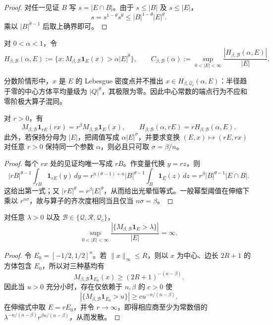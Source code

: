 \begin{proof}
对任一见证 $B$ 写 $s=|E\cap B|$。由于 $s\leq |B|$ 及 $s\leq |E|$，
\[
 s=s^{1-\theta}s^\theta
 \leq |B|^{1-\theta}|E|^\theta.
\]
乘以 $|B|^{\theta-1}$ 后取上确界即可。
\end{proof}

\begin{definition}
\label{fnd:def-halo}
对 $0<\alpha<1$，令
\[
 H_{\beta,\mathcal B}(\alpha,E):=
 \{x:M_{\beta,\mathcal B}\mathbf1_E(x)>\alpha|E|^\theta\},
 \qquad
 C_{\beta,\mathcal B}(\alpha):=
 \sup_{0<|E|<\infty}\frac{|H_{\beta,\mathcal B}(\alpha,E)|}{|E|}.
\]
\end{definition}

\begin{remark}
\label{fnd:center-density}
分数阶情形中，$x$ 是 $E$ 的 Lebesgue 密度点并不推出 $x\in H_{\beta,\mathcal Q_c}(\alpha,E)$：半径趋于零的中心方体平均量级为 $|Q|^\theta$，其极限为零。因此中心常数的端点行为不应和零阶极大算子混同。
\end{remark}

\begin{proposition}[伸缩律与唯一归一化]
\label{fnd:scaling}
对 $r>0$，有
\[
 M_{\beta,\mathcal B}\mathbf1_{rE}(rx)
 =r^\beta M_{\beta,\mathcal B}\mathbf1_E(x),
 \qquad
 H_{\beta,\mathcal B}(\alpha,rE)=rH_{\beta,\mathcal B}(\alpha,E).
\]
此外，若保持分母为 $|E|$，把阈值写成 $\alpha|E|^\sigma$，并要求变换
$(E,x)\mapsto(rE,rx)$ 对任意 $r>0$ 保持同一个参数 $\alpha$，则必且只可取
$\sigma=\beta/n$。
\end{proposition}

\begin{proof}
每个 $rx$ 处的见证均唯一写成 $rB$。作变量代换 $y=rz$，则
\[
 |rB|^{\theta-1}\int_{rB}\mathbf1_{rE}(y)\,dy
 =r^{n(\theta-1)+n}|B|^{\theta-1}\int_B\mathbf1_E(z)\,dz
 =r^\beta |B|^{\theta-1}|E\cap B|.
\]
这给出第一式；又 $|rE|^\theta=r^\beta|E|^\theta$，从而给出光晕恒等式。一般幂型阈值在伸缩下乘以 $r^{n\sigma}$，故与算子的齐次度相同当且仅当 $n\sigma=\beta$。
\end{proof}

\begin{proposition}[固定阈值的退化]
\label{fnd:raw-divergence}
对任意 $\lambda>0$ 以及
$\mathcal B\in\{\mathcal Q,\mathcal R,\mathcal Q_c\}$，
\[
 \sup_{0<|E|<\infty}
 \frac{|\{M_{\beta,\mathcal B}\mathbf1_E>\lambda\}|}{|E|}=\infty.
\]
\end{proposition}

\begin{proof}
令 $E_0=[-1/2,1/2]^n$。若 $\|x\|_\infty\leq R$，则以 $x$ 为中心、边长 $2R+1$ 的方体包含 $E_0$，所以对三种基均有
\[
 M_{\beta,\mathcal B}\mathbf1_{E_0}(x)\geq(2R+1)^{-(n-\beta)}.
\]
因此当 $u>0$ 充分小时，存在仅依赖于 $n,\beta$ 的 $c>0$ 使
\[
 |\{M_{\beta,\mathcal B}\mathbf1_{E_0}>u\}|
 \geq c u^{-n/(n-\beta)}.
\]
在伸缩式中取 $E=rE_0$，并令 $r\to\infty$，即得相应商至少为常数倍的
$\lambda^{-n/(n-\beta)}r^{\beta n/(n-\beta)}$，从而发散。
\end{proof}

